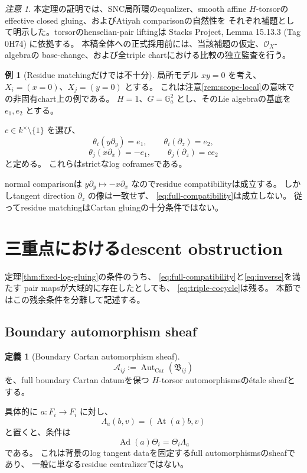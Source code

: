 \documentclass[uplatex,dvipdfmx,11pt]{jsarticle}
\numberwithin{equation}{section}
\theoremstyle{plain}
\theoremstyle{definition}
\newtheorem{definition}[theorem]{定義}
\newtheorem{example}[theorem]{例}
\theoremstyle{remark}
\newtheorem{remark}[theorem]{注意}
\DeclareMathOperator{\At}{At}
\DeclareMathOperator{\Ad}{Ad}
\DeclareMathOperator{\Aut}{Aut}
\newcommand{\OO}{\mathcal O}
\newcommand{\GG}{\mathbb G}
\newcommand{\Car}{\mathrm{Car}}
\newcommand{\calB}{\mathfrak B}
\begin{document}
\begin{remark}
\label{rem:gluing-proof-status}
本定理の証明では、SNC局所環のequalizer、smooth affine
$H$-torsorのeffective closed gluing、およびAtiyah comparisonの自然性を
それぞれ補題として明示した。torsorのhenselian-pair liftingは
Stacks Project, Lemma 15.13.3 (Tag 0H74) に依拠する。
本稿全体への正式採用前には、当該補題の仮定、$\OO_X$-algebraの
base-change、および全triple chartにおける比較の独立監査を行う。
\end{remark}


\begin{example}[Residue matchingだけでは不十分]
\label{ex:residue-not-enough}
局所モデル \(xy=0\) を考え、
\(X_i=(x=0)\)、\(X_j=(y=0)\) とする。
これは注意\ref{rem:scope-local}の意味での非固有chart上の例である。
\(H=1\)、\(G=\GG_a^2\) とし、そのLie algebraの基底を \(e_1,e_2\) とする。

\(c\in k^\times\setminus\{1\}\) を選び、
\[
\theta_i(y\partial_y)=e_1,\qquad
\theta_i(\partial_z)=e_2,
\]
\[
\theta_j(x\partial_x)=-e_1,\qquad
\theta_j(\partial_z)=c e_2
\]
と定める。
これらはstrictなlog coframesである。

normal comparisonは
\(y\partial_y\mapsto-x\partial_x\)
なのでresidue compatibilityは成立する。
しかしtangent direction \(\partial_z\) の像は一致せず、
\eqref{eq:full-compatibility}は成立しない。
従ってresidue matchingはCartan gluingの十分条件ではない。
\end{example}

\section{三重点におけるdescent obstruction}
\label{sec:triple-obstruction}

定理\ref{thm:fixed-log-gluing}の条件のうち、
\eqref{eq:full-compatibility}と\eqref{eq:inverse}を満たす
pair mapsが大域的に存在したとしても、
\eqref{eq:triple-cocycle}は残る。
本節ではこの残余条件を分離して記述する。

\subsection{Boundary automorphism sheaf}

\begin{definition}[Boundary Cartan automorphism sheaf]
\label{def:boundary-aut}
\[
\mathscr A_{ij}:=\Aut_{\Car}(\calB_{ij})
\]
を、full boundary Cartan datumを保つ \(H\)-torsor automorphismsのétale sheafとする。

具体的に \(a:F_i\to F_i\) に対し、
\[
\Lambda_a(b,v)=(\At(a)b,v)
\]
と置くと、条件は
\[
\Ad(a)\Theta_i=\Theta_i\Lambda_a
\]
である。
これは背景のlog tangent dataを固定するfull automorphismsのsheafであり、
一般に単なるresidue centralizerではない。
\end{definition}
\end{document}
